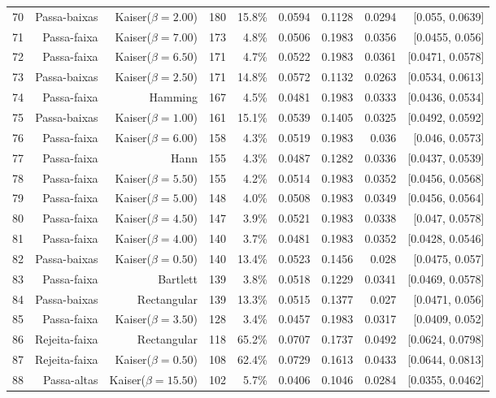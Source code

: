 \begin{longtable}{lrrrrrrrr}
    70 & Passa-baixas & Kaiser($\beta=2.00$) & 180 & 15.8\% & 0.0594 & 0.1128 & 0.0294 & [0.055, 0.0639] \\
    71 & Passa-faixa & Kaiser($\beta=7.00$) & 173 & 4.8\% & 0.0506 & 0.1983 & 0.0356 & [0.0455, 0.056] \\
    72 & Passa-faixa & Kaiser($\beta=6.50$) & 171 & 4.7\% & 0.0522 & 0.1983 & 0.0361 & [0.0471, 0.0578] \\
    73 & Passa-baixas & Kaiser($\beta=2.50$) & 171 & 14.8\% & 0.0572 & 0.1132 & 0.0263 & [0.0534, 0.0613] \\
    74 & Passa-faixa & Hamming & 167 & 4.5\% & 0.0481 & 0.1983 & 0.0333 & [0.0436, 0.0534] \\
    75 & Passa-baixas & Kaiser($\beta=1.00$) & 161 & 15.1\% & 0.0539 & 0.1405 & 0.0325 & [0.0492, 0.0592] \\
    76 & Passa-faixa & Kaiser($\beta=6.00$) & 158 & 4.3\% & 0.0519 & 0.1983 & 0.036 & [0.046, 0.0573] \\
    77 & Passa-faixa & Hann & 155 & 4.3\% & 0.0487 & 0.1282 & 0.0336 & [0.0437, 0.0539] \\
    78 & Passa-faixa & Kaiser($\beta=5.50$) & 155 & 4.2\% & 0.0514 & 0.1983 & 0.0352 & [0.0456, 0.0568] \\
    79 & Passa-faixa & Kaiser($\beta=5.00$) & 148 & 4.0\% & 0.0508 & 0.1983 & 0.0349 & [0.0456, 0.0564] \\
    80 & Passa-faixa & Kaiser($\beta=4.50$) & 147 & 3.9\% & 0.0521 & 0.1983 & 0.0338 & [0.047, 0.0578] \\
    81 & Passa-faixa & Kaiser($\beta=4.00$) & 140 & 3.7\% & 0.0481 & 0.1983 & 0.0352 & [0.0428, 0.0546] \\
    82 & Passa-baixas & Kaiser($\beta=0.50$) & 140 & 13.4\% & 0.0523 & 0.1456 & 0.028 & [0.0475, 0.057] \\
    83 & Passa-faixa & Bartlett & 139 & 3.8\% & 0.0518 & 0.1229 & 0.0341 & [0.0469, 0.0578] \\
    84 & Passa-baixas & Rectangular & 139 & 13.3\% & 0.0515 & 0.1377 & 0.027 & [0.0471, 0.056] \\
    85 & Passa-faixa & Kaiser($\beta=3.50$) & 128 & 3.4\% & 0.0457 & 0.1983 & 0.0317 & [0.0409, 0.052] \\
    86 & Rejeita-faixa & Rectangular & 118 & 65.2\% & 0.0707 & 0.1737 & 0.0492 & [0.0624, 0.0798] \\
    87 & Rejeita-faixa & Kaiser($\beta=0.50$) & 108 & 62.4\% & 0.0729 & 0.1613 & 0.0433 & [0.0644, 0.0813] \\
    88 & Passa-altas & Kaiser($\beta=15.50$) & 102 & 5.7\% & 0.0406 & 0.1046 & 0.0284 & [0.0355, 0.0462] \\

\end{longtable}
